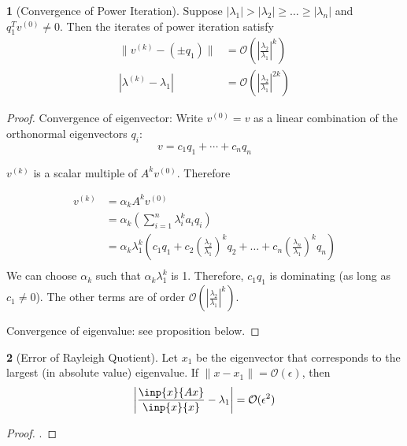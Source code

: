 \documentclass[12pt]{article}
\theoremstyle{definition}
\newtheorem{theorem}{\color{ForestGreen}{\textbf{Theorem}}}
\newcommand{\e}{\epsilon}
\newcommand{\norm}[1]{\lVert#1\rVert}
\theoremstyle{definition}
\begin{document}
\begin{theorem}[Convergence of Power Iteration]
Suppose $|\lambda_1|  > |\lambda_2| \geq \ldots \geq |\lambda_n|$ and $q_1^T v^{(0)} \neq 0$. Then the iterates of power iteration satisfy
\begin{align}
	\norm{v^{(k)} - (\pm q_1)} &= \mathcal{O}\left( \left\vert \frac{\lambda_2}{\lambda_1} \right\vert^k \right) \tag{error of eigenvector} \\
	|\lambda^{(k)} - \lambda_1 | &= \mathcal{O}\left( \left\vert \frac{\lambda_2}{\lambda_1} \right\vert^{2k} \right) \tag{error of eigenvalue}
\end{align}
\end{theorem}

\begin{proof}

Convergence of eigenvector: Write $v^{(0)} = v$ as a linear combination of the orthonormal eigenvectors $q_i$:
\begin{equation}
	v = c_1 q_1 + \cdots + c_nq_n
\end{equation}

$v^{(k)}$ is a scalar multiple of $A^k v^{(0)}$. Therefore

\begin{align*}
	v^{(k)} &= \alpha_k A^k v^{(0)} \tag{$\alpha_k$ a normalization constant} \\
	&= \alpha_k \left(\sum_{i=1}^n \lambda_i^k a_i q_i \right) \\
	&= \alpha_k \lambda_1^k \left( c_1q_1 + c_2 \left(\frac{\lambda_2}{\lambda_1} \right)^k q_2 + \ldots + c_n \left(\frac{\lambda_n}{\lambda_1} \right)^k q_n \right) \\
\end{align*}
We can choose $\alpha_k$ such that $\alpha_k \lambda_1^k$ is 1. Therefore, $c_1 q_1$ is dominating (as long as $c_1 \neq 0$). The other terms are of order $\mathcal{O}\left( \left\vert \frac{\lambda_2}{\lambda_1} \right\vert^k \right)$.

Convergence of eigenvalue: see proposition below.

\end{proof}

\begin{theorem}[Error of Rayleigh Quotient]
Let $x_1$ be the eigenvector that corresponds to the largest (in absolute value) eigenvalue. If $\norm{x - x_1} = \mathcal{O}(\e)$, then
\begin{equation}
	\left\vert \frac{\inp{x}{Ax}}{\inp{x}{x}}  - \lambda_1 \right\vert = \mathcal{O}(\e^2)
\end{equation}
\end{theorem}
\begin{proof}
\color{Red}{TODO}. 
\end{proof}
\end{document}
